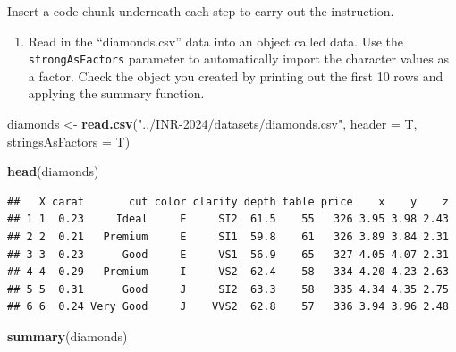 \documentclass[
]{book}
\newenvironment{Shaded}{\begin{snugshade}}{\end{snugshade}}
\newcommand{\AttributeTok}[1]{\textcolor[rgb]{0.13,0.29,0.53}{#1}}
\newcommand{\FunctionTok}[1]{\textcolor[rgb]{0.13,0.29,0.53}{\textbf{#1}}}
\newcommand{\NormalTok}[1]{#1}
\newcommand{\OtherTok}[1]{\textcolor[rgb]{0.56,0.35,0.01}{#1}}
\newcommand{\StringTok}[1]{\textcolor[rgb]{0.31,0.60,0.02}{#1}}
\providecommand{\tightlist}{%
  \setlength{\itemsep}{0pt}\setlength{\parskip}{0pt}}
\begin{document}
Insert a code chunk underneath each step to carry out the instruction.

\begin{enumerate}
\def\labelenumi{\arabic{enumi}.}
\tightlist
\item
  Read in the ``diamonds.csv'' data into an object called data. Use the \texttt{strongAsFactors} parameter to automatically import the character values as a factor. Check the object you created by printing out the first 10 rows and applying the summary function.
\end{enumerate}

\begin{Shaded}
\begin{Highlighting}[]
\NormalTok{diamonds }\OtherTok{\textless{}{-}} \FunctionTok{read.csv}\NormalTok{(}\StringTok{"../INR{-}2024/datasets/diamonds.csv"}\NormalTok{, }\AttributeTok{header =}\NormalTok{ T, }\AttributeTok{stringsAsFactors =}\NormalTok{ T)}

\FunctionTok{head}\NormalTok{(diamonds)}
\end{Highlighting}
\end{Shaded}

\begin{verbatim}
##   X carat       cut color clarity depth table price    x    y    z
## 1 1  0.23     Ideal     E     SI2  61.5    55   326 3.95 3.98 2.43
## 2 2  0.21   Premium     E     SI1  59.8    61   326 3.89 3.84 2.31
## 3 3  0.23      Good     E     VS1  56.9    65   327 4.05 4.07 2.31
## 4 4  0.29   Premium     I     VS2  62.4    58   334 4.20 4.23 2.63
## 5 5  0.31      Good     J     SI2  63.3    58   335 4.34 4.35 2.75
## 6 6  0.24 Very Good     J    VVS2  62.8    57   336 3.94 3.96 2.48
\end{verbatim}

\begin{Shaded}
\begin{Highlighting}[]
\FunctionTok{summary}\NormalTok{(diamonds)}
\end{Highlighting}
\end{Shaded}
\end{document}
